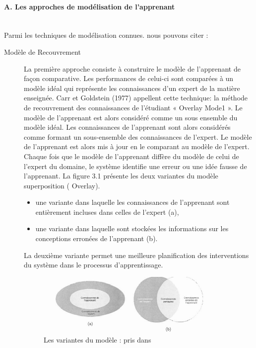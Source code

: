\paragraph{A. Les approches de modélisation de l'apprenant} \mbox{}\\
Parmi les techniques de modélisation connues. nous pouvons citer :
\begin{description}
    \item[Modèle de Recouvrement] La première approche consiste à construire le modèle de l'apprenant de façon comparative. Les performances de celui-ci sont comparées à un modèle idéal qui représente les connaissances d'un expert de la matière enseignée. Carr et Goldstein (1977) appellent cette technique: la méthode de recouvrement des connaissances de l'étudiant « Overlay Mode1 ». Le modèle de l'apprenant est alors considéré comme un sous ensemble du modèle idéal. Les connaissances de l'apprenant sont alors considérés comme formant un sous-ensemble des connaissances de l'expert. Le modèle de l'apprenant est alors mis à jour en le comparant au modèle de l'expert. Chaque fois que le modèle de l'apprenant diffère du modèle de celui de l'expert du domaine, le système identifie une erreur ou une idée fausse de l'apprenant. La figure 3.1 présente les deux variantes du modèle superposition ( Overlay).
    
    \begin{itemize}
        \item une variante dans laquelle les connaissances de l'apprenant sont entièrement incluses dans celles de l'expert (a),
        \item une variante dans laquelle sont stockées les informations sur les conceptions erronées de l'apprenant (b).
    \end{itemize}
 
    La deuxième variante permet une meilleure planification des interventions du système dans le processus d'apprentissage. 
 
    \begin{figure}
        \centering
        \includegraphics[width=0.9\textwidth]{figures/mdele.png}
        \captionsetup{justification=centering}
        \caption{Les variantes du modèle : pris dans \cite{nkambou2010advances}}
    \end{figure}
  \end{description}
